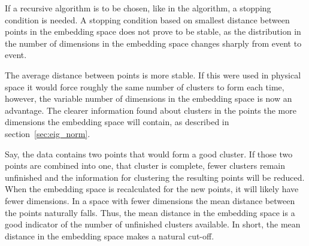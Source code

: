 If a recursive algorithm is to be chosen, like in the \genkt{} algorithm, a stopping condition is needed.
A stopping condition based on smallest distance between points in the embedding space does not prove to be stable,
as the distribution  in the number of dimensions in the embedding space changes sharply from event to event.

The average distance between points is more stable.
If this were used in physical space it would force roughly the same number of clusters to form each time,
however, the variable number of dimensions in the embedding space is now an advantage.
The  clearer information found about clusters in the points the more dimensions the embedding space will contain,
as described in section~\ref{sec:eig_norm}.

Say, the data contains two points that would form a good cluster.
If those two points are combined into one, that cluster is complete,
fewer clusters remain unfinished
and the information for clustering the resulting points will be reduced.
When the embedding space is recalculated for the new points, it will likely have fewer dimensions.
In a space with fewer dimensions the mean distance between the points naturally falls.
Thus, the mean distance in the embedding space is a good indicator of the number of unfinished clusters available.
In short, the mean distance in the embedding space makes a natural cut-off.
